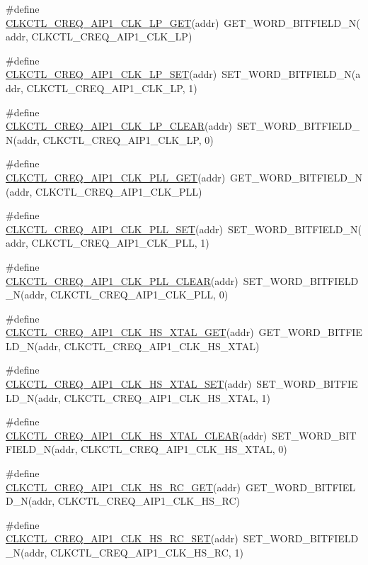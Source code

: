 \begin{DoxyCompactItemize}
\#define \hyperlink{a00544_a6bc544eb9ab4ca37b701a51ba2571849}{CLKCTL\_\-CREQ\_\-AIP1\_\-CLK\_\-LP\_\-GET}(addr)~GET\_\-WORD\_\-BITFIELD\_\-N(addr, CLKCTL\_\-CREQ\_\-AIP1\_\-CLK\_\-LP)
\item 
\#define \hyperlink{a00544_a33ccd51862c6c2f7dc554e97ee650459}{CLKCTL\_\-CREQ\_\-AIP1\_\-CLK\_\-LP\_\-SET}(addr)~SET\_\-WORD\_\-BITFIELD\_\-N(addr, CLKCTL\_\-CREQ\_\-AIP1\_\-CLK\_\-LP, 1)
\item 
\#define \hyperlink{a00544_af3d7586a2d97f6360bc160b290464f1f}{CLKCTL\_\-CREQ\_\-AIP1\_\-CLK\_\-LP\_\-CLEAR}(addr)~SET\_\-WORD\_\-BITFIELD\_\-N(addr, CLKCTL\_\-CREQ\_\-AIP1\_\-CLK\_\-LP, 0)
\item 
\#define \hyperlink{a00544_a21e8d3eda64ea8f4e21923748aa1f0e6}{CLKCTL\_\-CREQ\_\-AIP1\_\-CLK\_\-PLL\_\-GET}(addr)~GET\_\-WORD\_\-BITFIELD\_\-N(addr, CLKCTL\_\-CREQ\_\-AIP1\_\-CLK\_\-PLL)
\item 
\#define \hyperlink{a00544_a93b9aa90dda52c64a2bedb99156087a4}{CLKCTL\_\-CREQ\_\-AIP1\_\-CLK\_\-PLL\_\-SET}(addr)~SET\_\-WORD\_\-BITFIELD\_\-N(addr, CLKCTL\_\-CREQ\_\-AIP1\_\-CLK\_\-PLL, 1)
\item 
\#define \hyperlink{a00544_ac1a95783a441d3e4f84ea788442cf7a2}{CLKCTL\_\-CREQ\_\-AIP1\_\-CLK\_\-PLL\_\-CLEAR}(addr)~SET\_\-WORD\_\-BITFIELD\_\-N(addr, CLKCTL\_\-CREQ\_\-AIP1\_\-CLK\_\-PLL, 0)
\item 
\#define \hyperlink{a00544_a405dd8c104a3f25ab9668941d9f63a80}{CLKCTL\_\-CREQ\_\-AIP1\_\-CLK\_\-HS\_\-XTAL\_\-GET}(addr)~GET\_\-WORD\_\-BITFIELD\_\-N(addr, CLKCTL\_\-CREQ\_\-AIP1\_\-CLK\_\-HS\_\-XTAL)
\item 
\#define \hyperlink{a00544_ab6569611c20b5a1594902ced8d872583}{CLKCTL\_\-CREQ\_\-AIP1\_\-CLK\_\-HS\_\-XTAL\_\-SET}(addr)~SET\_\-WORD\_\-BITFIELD\_\-N(addr, CLKCTL\_\-CREQ\_\-AIP1\_\-CLK\_\-HS\_\-XTAL, 1)
\item 
\#define \hyperlink{a00544_aa8f92ef21f3f699c2137b7a2e868efb7}{CLKCTL\_\-CREQ\_\-AIP1\_\-CLK\_\-HS\_\-XTAL\_\-CLEAR}(addr)~SET\_\-WORD\_\-BITFIELD\_\-N(addr, CLKCTL\_\-CREQ\_\-AIP1\_\-CLK\_\-HS\_\-XTAL, 0)
\item 
\#define \hyperlink{a00544_a9c13c62b85e23af39ce0c5ed6cb9a8e5}{CLKCTL\_\-CREQ\_\-AIP1\_\-CLK\_\-HS\_\-RC\_\-GET}(addr)~GET\_\-WORD\_\-BITFIELD\_\-N(addr, CLKCTL\_\-CREQ\_\-AIP1\_\-CLK\_\-HS\_\-RC)
\item 
\#define \hyperlink{a00544_a6d2f1b1ca35845f2e57c4ad7423b6e5a}{CLKCTL\_\-CREQ\_\-AIP1\_\-CLK\_\-HS\_\-RC\_\-SET}(addr)~SET\_\-WORD\_\-BITFIELD\_\-N(addr, CLKCTL\_\-CREQ\_\-AIP1\_\-CLK\_\-HS\_\-RC, 1)
\item 

\end{DoxyCompactItemize}
